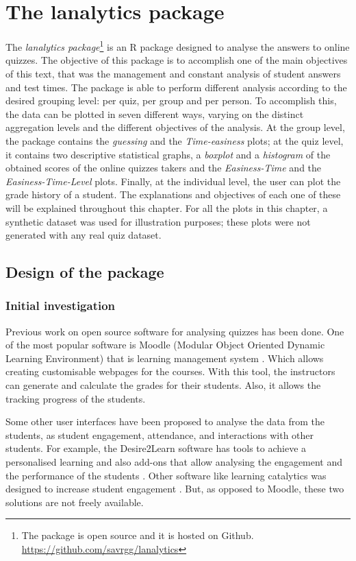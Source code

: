 \chapter{The lanalytics package}

The \textit{lanalytics package}\footnote{The package is open source and it is hosted on Github. \url{https://github.com/savrgg/lanalytics}} is an R package designed to analyse the answers to online quizzes. The objective of this package is to accomplish one of the main objectives of this text, that was the management and constant analysis of student answers and test times. The package is able to perform different analysis according to the desired grouping level: per quiz, per group and per person. To accomplish this, the data can be plotted in seven different ways, varying on the distinct aggregation levels and the different objectives of the analysis. At the group level, the package contains the \textit{guessing} and the \textit{Time-easiness} plots; at the quiz level, it contains two descriptive statistical graphs, a \textit{boxplot} and a \textit{histogram} of the obtained scores of the online quizzes takers and the \textit{Easiness-Time} and the \textit{Easiness-Time-Level} plots. Finally, at the individual level, the user can plot the grade history of a student. The explanations and objectives of each one of these will be explained throughout this chapter. For all the plots in this chapter, a synthetic dataset was used for illustration purposes; these plots were not generated with any real quiz dataset.

\section{Design of the package}

\subsection{Initial investigation}

Previous work on open source software for analysing quizzes has been done. One of the most popular software is Moodle (Modular Object Oriented Dynamic Learning Environment) that is learning management system \cite{zeileis2012flexible} \cite{moodle}. Which allows creating customisable webpages for the courses. With this tool, the instructors can generate and calculate the grades for their students. Also, it allows the tracking progress of the students. 

Some other user interfaces have been proposed to analyse the data from the students, as student engagement, attendance, and interactions with other students. For example, the Desire2Learn software has tools to achieve a personalised learning and also add-ons that allow analysing the engagement and the performance of the students \cite{desire}. Other software like learning catalytics was designed to increase student engagement  \cite{learningcatalytics}. But, as opposed to Moodle, these two solutions are not freely available.

